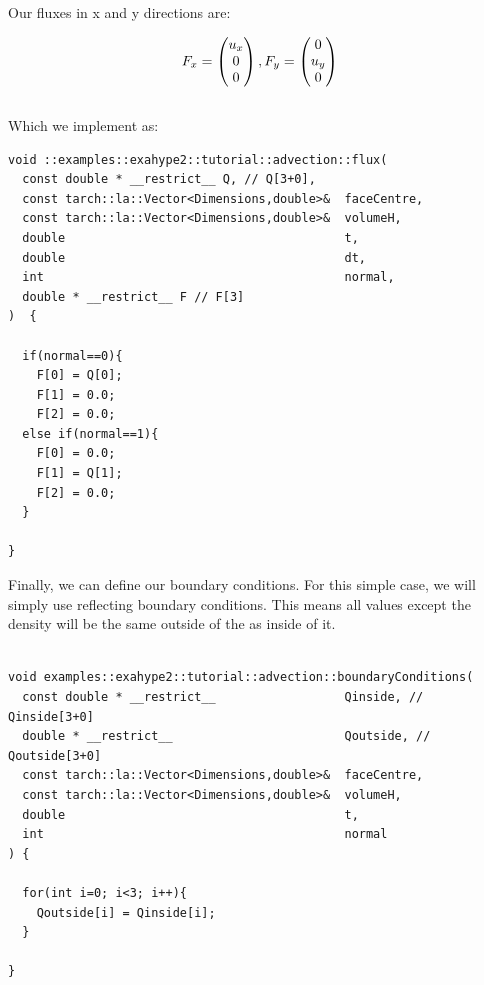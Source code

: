 \documentclass[12pt,letterpaper]{article}
\begin{document}
Our fluxes in x and y directions are:

\begin{equation*}
    F_x = \begin{pmatrix}
                      u_x \\
                      0 \\
                      0
    \end{pmatrix}, \hspace{\fill} 
    F_y =\begin{pmatrix}
                      0 \\
                      u_y \\
                      0
    \end{pmatrix}
\end{equation*}\\

Which we implement as:

\newpage

\begin{lstlisting}[style = C++]
void ::examples::exahype2::tutorial::advection::flux(
  const double * __restrict__ Q, // Q[3+0],
  const tarch::la::Vector<Dimensions,double>&  faceCentre,
  const tarch::la::Vector<Dimensions,double>&  volumeH,
  double                                       t,
  double                                       dt,
  int                                          normal,
  double * __restrict__ F // F[3]
)  {
	
  if(normal==0){
    F[0] = Q[0];
    F[1] = 0.0;
    F[2] = 0.0;
  else if(normal==1){
    F[0] = 0.0;
    F[1] = Q[1];
    F[2] = 0.0;
  }
  
}
\end{lstlisting}


Finally, we can define our boundary conditions. For this simple case, we will simply use reflecting boundary conditions. This means all values except the density will be the same outside of the as inside of it.\\ \\


\begin{lstlisting}[style = C++]
void examples::exahype2::tutorial::advection::boundaryConditions(
  const double * __restrict__                  Qinside, // Qinside[3+0]
  double * __restrict__                        Qoutside, // Qoutside[3+0]
  const tarch::la::Vector<Dimensions,double>&  faceCentre,
  const tarch::la::Vector<Dimensions,double>&  volumeH,
  double                                       t,
  int                                          normal
) {

  for(int i=0; i<3; i++){
    Qoutside[i] = Qinside[i];
  }

}
\end{lstlisting}
\end{document}
